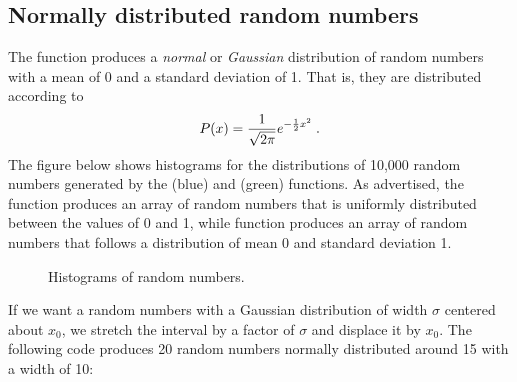 \documentclass[letterpaper,10pt,english]{sphinxmanual}
\begin{document}
\subsection{Normally distributed random numbers}
\label{chap3/chap3_arrays:normally-distributed-random-numbers}
The function  produces a \emph{normal} or \emph{Gaussian} distribution of  random numbers with a mean of 0 and a standard deviation of 1.  That is, they are distributed according to
\begin{gather}
\begin{split}P(x) = \frac{1}{\sqrt{2\pi}} e^{-\frac{1}{2}x^2} \;.\end{split}\notag
\end{gather}
The figure below shows histograms for the distributions of 10,000 random numbers generated by the  (blue) and  (green) functions.  As advertised, the  function produces an array of random numbers that is uniformly distributed between the values of 0 and 1, while  function produces an array of random numbers that follows a distribution of mean 0 and standard deviation 1.
\begin{figure}[htbp]
\centering
\capstart

\caption{Histograms of random numbers.}\label{chap3/chap3_arrays:fig-randhistos}\end{figure}

If we want a random numbers with a Gaussian distribution of width \(\sigma\) centered about \(x_0\), we stretch the interval by a factor of \(\sigma\) and displace it by \(x_0\).  The following code produces 20 random numbers normally distributed around 15 with a width of 10:
\end{document}
